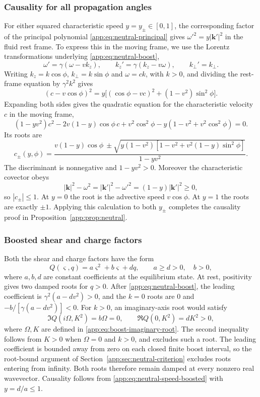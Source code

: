 \subsubsection*{Causality for all propagation angles}
For either squared characteristic speed $y=y_\pm\in[0,1]$, the
corresponding factor of the principal polynomial
\eqref{app:eq:neutral-principal} gives
$\omega'^2=y|\boldsymbol k'|^2$ in the fluid rest frame.
To express this in the moving frame, we use the Lorentz transformations
underlying \eqref{app:eq:neutral-boost},
\[
 \omega'=\gamma(\omega-vk_z),\qquad
 k_z'=\gamma(k_z-v\omega),\qquad k_\perp'=k_\perp.
\]
Writing $k_z=k\cos\phi$, $k_\perp=k\sin\phi$ and $\omega=ck$,
with $k>0$, and dividing the rest-frame equation by $\gamma^2k^2$ gives
\[
 (c-v\cos\phi)^2
 =y\bigl[(\cos\phi-vc)^2+(1-v^2)\sin^2\phi\bigr].
\]
Expanding both sides gives the quadratic equation for the characteristic
velocity $c$ in the moving frame,
\begin{equation}\label{app:eq:neutral-speed-quadratic}
 (1-yv^2)c^2-2v(1-y)\cos\phi\,c
 +v^2\cos^2\phi-y(1-v^2+v^2\cos^2\phi)=0.
\end{equation}
Its roots are
\begin{equation}\label{app:eq:neutral-speed-boosted}
 c_\pm(y,\phi)=\frac{v(1-y)\cos\phi
 \ \pm\sqrt{y(1-v^2)[1-v^2+v^2(1-y)\sin^2\phi]}}{1-yv^2}.
\end{equation}
The discriminant is nonnegative and $1-yv^2>0$. Moreover the characteristic
covector obeys
\[
 |\boldsymbol k|^2-\omega^2
 =|\boldsymbol k'|^2-\omega'^2=(1-y)|\boldsymbol k'|^2\geq0,
\]
so $|c_\pm|\leq1$. At $y=0$ the root is the advective speed $v\cos\phi$.
At $y=1$ the roots are exactly $\pm1$. Applying this calculation to both
$y_\pm$ completes the causality proof in Proposition~\ref{app:prop:neutral}.

\subsubsection{Boosted shear and charge factors}
\label{app:sec:shear}
Both the shear and charge factors have the form
\[
 Q(\varsigma,q)=a\varsigma^2+b\varsigma+dq,
 \qquad a\geq d>0,\quad b>0,
\]
where $a,b,d$ are constant coefficients at the equilibrium state.
At rest, positivity gives two damped roots for $q>0$. After
\eqref{app:eq:neutral-boost}, the leading coefficient is
$\gamma^2(a-dv^2)>0$, and the $k=0$ roots are $0$ and
$-b/[\gamma(a-dv^2)]<0$.
For $k>0$, an imaginary-axis root would satisfy
\[
 \Im Q(i\Omega,K^2)=b\Omega=0,\qquad
 \Re Q(0,K^2)=dK^2>0,
\]
where $\Omega,K$ are defined in \eqref{app:eq:boost-imaginary-root}.
The second inequality follows from $K>0$ when $\Omega=0$ and $k>0$,
and excludes such a root. The leading coefficient is bounded away
from zero on each closed finite boost interval, so the root-bound
argument of Section~\ref{app:sec:neutral-criterion} excludes roots
entering from infinity. Both roots therefore remain damped at every
nonzero real wavevector. Causality follows from
\eqref{app:eq:neutral-speed-boosted} with $y=d/a\leq1$.

